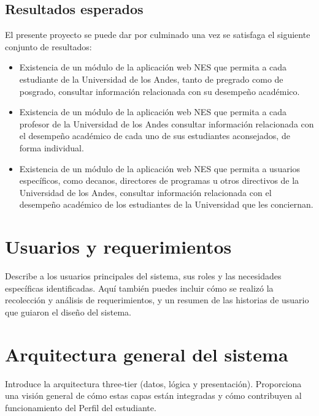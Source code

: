 \subsection{Resultados esperados}

El presente proyecto se puede dar por culminado una vez se satisfaga el siguiente conjunto de resultados:
\begin{itemize}
	\item Existencia de un módulo de la aplicación web NES que permita a cada estudiante de la Universidad de los Andes, tanto de pregrado como de posgrado, consultar información relacionada con su desempeño académico.
	\item Existencia de un módulo de la aplicación web NES que permita a cada profesor de la Universidad de los Andes consultar información relacionada con el desempeño académico de cada uno de sus estudiantes aconsejados, de forma individual.
	\item Existencia de un módulo de la aplicación web NES que permita a usuarios específicos, como decanos, directores de programas u otros directivos de la Universidad de los Andes, consultar información relacionada con el desempeño académico de los estudiantes de la Universidad que les conciernan.
\end{itemize}

\section{Usuarios y requerimientos}
Describe a los usuarios principales del sistema, sus roles y las necesidades específicas identificadas. Aquí también puedes incluir cómo se realizó la recolección y análisis de requerimientos, y un resumen de las historias de usuario que guiaron el diseño del sistema.

\section{Arquitectura general del sistema}
Introduce la arquitectura three-tier (datos, lógica y presentación). Proporciona una visión general de cómo estas capas están integradas y cómo contribuyen al funcionamiento del Perfil del estudiante.